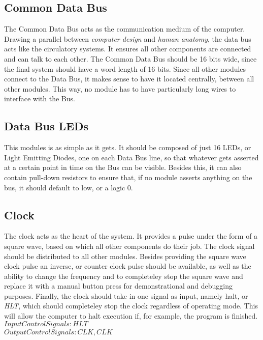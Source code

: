 \subsection{Common Data Bus} \label{common-data-bus}
The Common Data Bus acts as the communication medium of the computer. Drawing a parallel between \emph{computer design}
and \emph{human anatomy}, the data bus acts like the circulatory systems. It ensures all other components are connected
and can talk to each other. The Common Data Bus should be 16 bits wide, since the final system should have a word length of
16 bits. Since all other modules connect to the Data Bus, it makes sense to have it located centrally, between all other modules.
This way, no module has to have particularly long wires to interface with the Bus.

\subsection{Data Bus LEDs} \label{data-bus-leds}
This modules is as simple as it gets. It should be composed of just 16 LEDs, or Light Emitting Diodes, one on each Data Bus line,
so that whatever gets asserted at a certain point in time on the Bus can be visible. Besides this, it can also contain pull-down
resistors to ensure that, if no module asserts anything on the bus, it should default to low, or a logic 0.

\subsection{Clock} \label{clock}
The clock acts as the heart of the system. It provides a pulse under the form of a square wave, based on which all other components
do their job. The clock signal should be distributed to all other modules. Besides providing the square wave clock pulse an inverse,
or counter clock pulse should be available, as well as the ability to change the frequency and to completeley stop the square wave
and replace it with a manual button press for demonstrational and debugging purposes.
Finally, the clock should take in one signal as input, namely halt, or \emph{HLT},
which should completeley stop the clock regardless of operating mode. This will allow the computer to halt execution
if, for example, the program is finished. \\
\textbf{$Input Control Signals: HLT$} \\
\textbf{$Output Control Signals: CLK, \overline{CLK}$}

